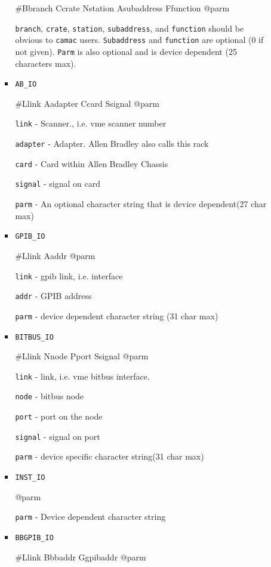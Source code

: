 \begin{itemize}
\begin{itemize}
\begin{itemize}
\#Bbranch Ccrate Nstation Asubaddress Ffunction @parm

\verb|branch|, \verb|crate|, \verb|station|, \verb|subaddress|, and \verb|function| should be obvious to \verb|camac| users. 
\verb|Subaddress| and \verb|function| are optional (0 if not given). \verb|Parm| is also optional and is device 
dependent (25 characters max).

\item \verb|AB_IO|

\#Llink Aadapter Ccard Ssignal @parm

\verb|link| - Scanner., i.e. vme scanner number

\verb|adapter| - Adapter. Allen Bradley also calls this rack

\verb|card| - Card within Allen Bradley Chassis

\verb|signal| - signal on card

\verb|parm| - An optional character string that is device dependent(27 char max)

\item \verb|GPIB_IO|

\#Llink Aaddr @parm

\verb|link| - gpib link, i.e. interface

\verb|addr| - GPIB address

\verb|parm| - device dependent character string (31 char max)

\item \verb|BITBUS_IO|

\#Llink Nnode Pport Ssignal @parm

\verb|link| - link, i.e.  vme bitbus interface.

\verb|node| - bitbus node

\verb|port| - port on the node

\verb|signal| - signal on port

\verb|parm| - device specific character string(31 char max)

\item \verb|INST_IO|

@parm

\verb|parm| - Device dependent character string

\item \verb|BBGPIB_IO|

\#Llink Bbbaddr Ggpibaddr @parm


\end{itemize}
\end{itemize}
\end{itemize}
